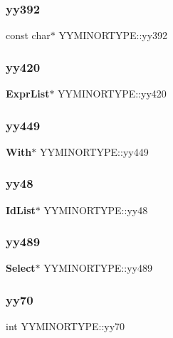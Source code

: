 \subsubsection{yy392}
{\footnotesize\ttfamily const char$\ast$ Y\+Y\+M\+I\+N\+O\+R\+T\+Y\+P\+E\+::yy392}

\mbox{\label{union_y_y_m_i_n_o_r_t_y_p_e_a4394b60b15b0a10b433af5c3506a816d}} 
\subsubsection{yy420}
{\footnotesize\ttfamily \textbf{ Expr\+List}$\ast$ Y\+Y\+M\+I\+N\+O\+R\+T\+Y\+P\+E\+::yy420}

\mbox{\label{union_y_y_m_i_n_o_r_t_y_p_e_ad601f9927069ef53ff43c67437ad89e6}} 
\subsubsection{yy449}
{\footnotesize\ttfamily \textbf{ With}$\ast$ Y\+Y\+M\+I\+N\+O\+R\+T\+Y\+P\+E\+::yy449}

\mbox{\label{union_y_y_m_i_n_o_r_t_y_p_e_a5091639c1e2cc6c45d892c3f8e70cd7b}} 
\subsubsection{yy48}
{\footnotesize\ttfamily \textbf{ Id\+List}$\ast$ Y\+Y\+M\+I\+N\+O\+R\+T\+Y\+P\+E\+::yy48}

\mbox{\label{union_y_y_m_i_n_o_r_t_y_p_e_a02389647368f2c6abba4d8b7ac7ed04f}} 
\subsubsection{yy489}
{\footnotesize\ttfamily \textbf{ Select}$\ast$ Y\+Y\+M\+I\+N\+O\+R\+T\+Y\+P\+E\+::yy489}

\mbox{\label{union_y_y_m_i_n_o_r_t_y_p_e_a49c126fc7601126c92ac39a7b095a952}} 
\subsubsection{yy70}
{\footnotesize\ttfamily int Y\+Y\+M\+I\+N\+O\+R\+T\+Y\+P\+E\+::yy70}

